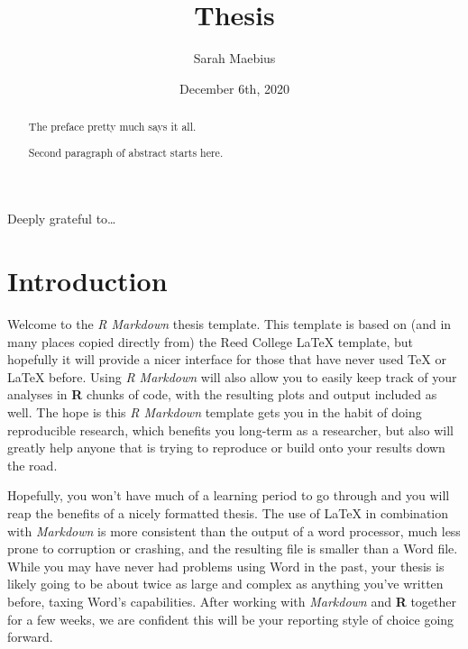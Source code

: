 \documentclass[12pt,twoside]{reedthesis}
\title{Thesis}
\author{Sarah Maebius}
\date{December 6th, 2020}
\begin{document}
  \maketitle

\frontmatter %
\pagestyle{empty} %
  \begin{acknowledgements}
    Deeply grateful to\ldots{}
  \end{acknowledgements}

  \hypersetup{linkcolor=black}
  \setcounter{tocdepth}{2}
  \tableofcontents

  \listoftables

  \listoffigures
  \begin{abstract}
    The preface pretty much says it all.
    
    \par
    
    Second paragraph of abstract starts here.
  \end{abstract}

\mainmatter %
\pagestyle{fancyplain} %

\hypertarget{introduction}{%
\chapter*{Introduction}\label{introduction}}

Welcome to the \emph{R Markdown} thesis template. This template is based on (and in many places copied directly from) the Reed College LaTeX template, but hopefully it will provide a nicer interface for those that have never used TeX or LaTeX before. Using \emph{R Markdown} will also allow you to easily keep track of your analyses in \textbf{R} chunks of code, with the resulting plots and output included as well. The hope is this \emph{R Markdown} template gets you in the habit of doing reproducible research, which benefits you long-term as a researcher, but also will greatly help anyone that is trying to reproduce or build onto your results down the road.

Hopefully, you won't have much of a learning period to go through and you will reap the benefits of a nicely formatted thesis. The use of LaTeX in combination with \emph{Markdown} is more consistent than the output of a word processor, much less prone to corruption or crashing, and the resulting file is smaller than a Word file. While you may have never had problems using Word in the past, your thesis is likely going to be about twice as large and complex as anything you've written before, taxing Word's capabilities. After working with \emph{Markdown} and \textbf{R} together for a few weeks, we are confident this will be your reporting style of choice going forward.
\end{document}
